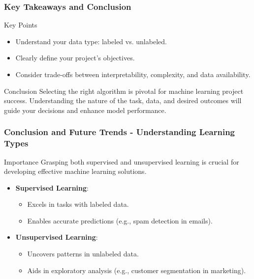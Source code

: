\documentclass{beamer}
\begin{document}
\begin{frame}[fragile]
    \frametitle{Key Takeaways and Conclusion}
    \begin{block}{Key Points}
        \begin{itemize}
            \item Understand your data type: labeled vs. unlabeled.
            \item Clearly define your project's objectives.
            \item Consider trade-offs between interpretability, complexity, and data availability.
        \end{itemize}
    \end{block}

    \begin{block}{Conclusion}
        Selecting the right algorithm is pivotal for machine learning project success. Understanding the nature of the task, data, and desired outcomes will guide your decisions and enhance model performance.
    \end{block}
\end{frame}

\begin{frame}[fragile]
    \frametitle{Conclusion and Future Trends - Understanding Learning Types}
    \begin{block}{Importance}
        Grasping both supervised and unsupervised learning is crucial for developing effective machine learning solutions.
    \end{block}
    \begin{itemize}
        \item \textbf{Supervised Learning}:
        \begin{itemize}
            \item Excels in tasks with labeled data.
            \item Enables accurate predictions (e.g., spam detection in emails).
        \end{itemize}
        \item \textbf{Unsupervised Learning}:
        \begin{itemize}
            \item Uncovers patterns in unlabeled data.
            \item Aids in exploratory analysis (e.g., customer segmentation in marketing).
        \end{itemize}
    \end{itemize}
\end{frame}
\end{document}
